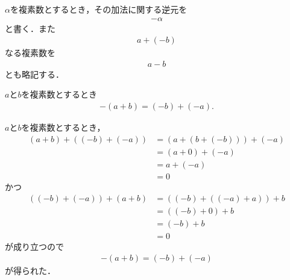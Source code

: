 	$\alpha$を複素数とするとき，その加法に関する逆元を
	\begin{align}
		- \alpha
	\end{align}
	と書く．また
	\begin{align}
		a + (-b)
	\end{align}
	なる複素数を
	\begin{align}
		a - b
	\end{align}
	とも略記する．
	
	\begin{screen}
		\begin{thm}[和の逆元は逆元の和]
		\label{thm:inverse_of_sum}
			$a$と$b$を複素数とするとき
			\begin{align}
				-(a + b) = (-b) + (-a).
			\end{align}
		\end{thm}
	\end{screen}
	
	\begin{sketch}
		$a$と$b$を複素数とするとき，
		\begin{align}
			(a+b) + ((-b) + (-a))
			&= (a + (b + (-b))) + (-a) \\
			&= (a + 0) + (-a) \\
			&= a + (-a) \\
			&= 0 
		\end{align}
		かつ
		\begin{align}
			((-b) + (-a)) + (a+b)
			&= ((-b) + ((-a) + a)) + b \\
			&= ((-b) + 0) + b \\
			&= (-b) + b \\
			&= 0
		\end{align}
		が成り立つので
		\begin{align}
			-(a + b) = (-b) + (-a)
		\end{align}
		が得られた．
		\QED
	\end{sketch}
	
